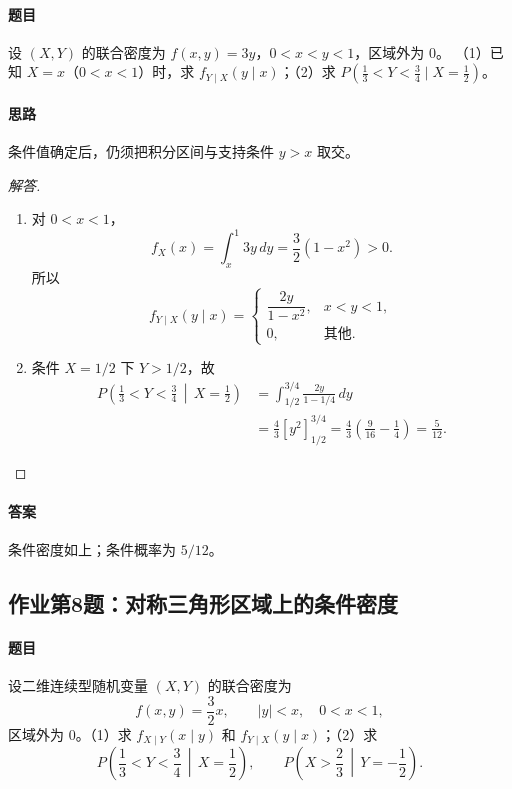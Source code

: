 \paragraph{题目}
设 $(X,Y)$ 的联合密度为 $f(x,y)=3y$，$0<x<y<1$，区域外为 $0$。
（1）已知 $X=x$（$0<x<1$）时，求 $f_{Y\mid X}(y\mid x)$；（2）求 $P(\frac13<Y<\frac34\mid X=\frac12)$。
\paragraph{思路}条件值确定后，仍须把积分区间与支持条件 $y>x$ 取交。
\begin{proof}[解答]
\begin{enumerate}
\item 对 $0<x<1$，
\[
f_X(x)=\int_x^1 3y\,dy=\frac32(1-x^2)>0.
\]
所以
\[
f_{Y\mid X}(y\mid x)=\begin{cases}\dfrac{2y}{1-x^2},&x<y<1,\\0,&\text{其他}.\end{cases}
\]
\item 条件 $X=1/2$ 下 $Y>1/2$，故
\begin{align*}
P\left(\frac13<Y<\frac34\,\middle|\,X=\frac12\right)
&=\int_{1/2}^{3/4}\frac{2y}{1-1/4}\,dy\\
&=\frac43\left[ y^2\right]_{1/2}^{3/4}
=\frac43\left(\frac9{16}-\frac14\right)=\frac5{12}.
\end{align*}
\end{enumerate}
\end{proof}
\paragraph{答案}条件密度如上；条件概率为 $5/12$。

\subsection{作业第8题：对称三角形区域上的条件密度}\label{ex:w11-h8}
\paragraph{题目}
设二维连续型随机变量 $(X,Y)$ 的联合密度为
\[
f(x,y)=\frac32x,\qquad |y|<x,\quad0<x<1,
\]
区域外为 $0$。（1）求 $f_{X\mid Y}(x\mid y)$ 和 $f_{Y\mid X}(y\mid x)$；（2）求
\[
P\left(\frac13<Y<\frac34\,\middle|\,X=\frac12\right),\qquad
P\left(X>\frac23\,\middle|\,Y=-\frac12\right).
\]
